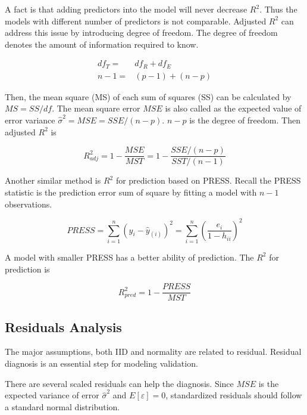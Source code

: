 \documentclass[
  11pt,
  openany]{memoir}
\begin{document}
A fact is that adding predictors into the model will never decrease \(R^2\). Thus the models with different number of predictors is not comparable. Adjusted \(R^2\) can address this issue by introducing degree of freedom. The degree of freedom denotes the amount of information required to know.

\begin{equation}
\begin{split}
df_T =& df_R + df_E\\
n-1=&(p-1)+(n-p)
\end{split}
\label{eq:df}
\end{equation}

Then, the mean square (MS) of each sum of squares (SS) can be calculated by \(MS=SS/df\). The mean square error \(MSE\) is also called as the expected value of error variance \(\hat\sigma^2=MSE=SSE/(n-p)\). \(n-p\) is the degree of freedom. Then adjusted \(R^2\) is

\begin{equation}
R_{adj}^2 = 1-\frac{MSE}{MST} = 1-\frac{SSE/(n-p)}{SST/(n-1)}
\label{eq:rsq-adj}
\end{equation}

Another similar method is \(R^2\) for prediction based on PRESS.
Recall the PRESS statistic is the prediction error sum of square by fitting a model with \(n-1\) observations.

\begin{equation}
PRESS = \sum_{i=1}^n(y_i-\hat y_{(i)})^2= \sum_{i=1}^n\left(\frac{e_i}{1-h_{ii}}\right)^2
\label{eq:press}
\end{equation}

A model with smaller PRESS has a better ability of prediction. The \(R^2\) for prediction is

\begin{equation}
R_{pred}^2 = 1-\frac{PRESS}{MST}
\label{eq:rsq-pred}
\end{equation}

\hypertarget{residuals-analysis}{%
\subsection{Residuals Analysis}\label{residuals-analysis}}

The major assumptions, both IID and normality are related to residual.
Residual diagnosis is an essential step for modeling validation.

There are several scaled residuals can help the diagnosis.
Since \(MSE\) is the expected variance of error \(\hat\sigma^2\) and \(E[\varepsilon]=0\), standardized residuals should follow a standard normal distribution.
\end{document}
